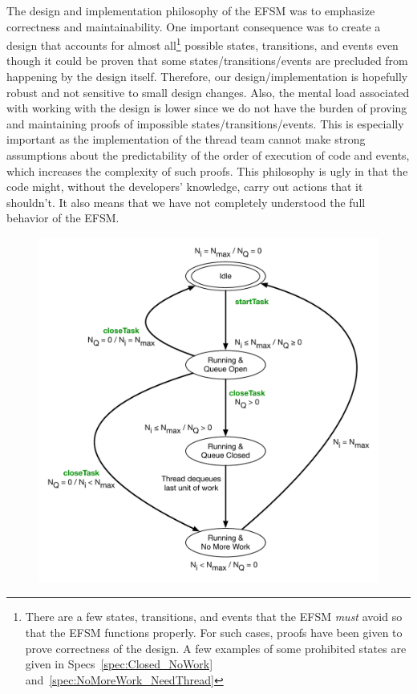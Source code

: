 \documentclass{article}
\begin{document}
The design and implementation philosophy of the EFSM was to emphasize
correctness and maintainability.  One important consequence was to create a
design that accounts for almost all\footnote{There are a few states,
transitions, and events that the EFSM \textit{must} avoid so that the EFSM
functions properly.  For such cases, proofs have been given to prove correctness
of the design.  A few examples of some prohibited states are given in
Specs~\ref{spec:Closed_NoWork} and~\ref{spec:NoMoreWork_NeedThread}} possible
states, transitions, and events even though it could be proven that some
states/transitions/events are precluded from happening by the design itself.
Therefore, our design/implementation is hopefully robust and not sensitive to
small design changes.  Also, the mental load associated with working with the
design is lower since we do not have the burden of proving and maintaining
proofs of impossible states/transitions/events.  This is especially important as
the implementation of the thread team cannot make strong assumptions about the
predictability of the order of execution of code and events, which increases the
complexity of such proofs.  This philosophy is ugly in that the code might,
without the developers' knowledge, carry out actions that it shouldn't.  It also
means that we have not completely understood the full behavior of the EFSM.

\begin{figure}[!ht]
\begin{center}
\includegraphics[width=5.0in]{TeamStates.pdf}
\caption[]{}
\label{fig:TeamStateDiagram}
\end{center}
\end{figure}
\end{document}
